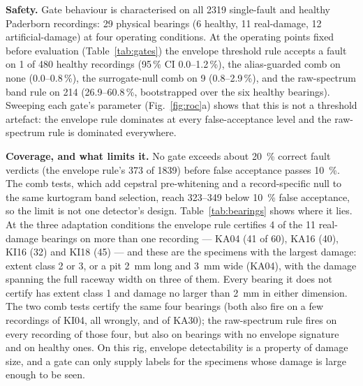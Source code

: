 \textbf{Safety.} Gate behaviour is characterised on all 2319 single-fault and healthy Paderborn recordings: 29 physical
bearings (6 healthy, 11 real-damage, 12 artificial-damage) at four operating conditions. At the operating points fixed
before evaluation (Table~\ref{tab:gates}) the envelope threshold rule accepts a fault on 1 of 480 healthy recordings (95\,\%
CI 0.0--1.2\,\%), the alias-guarded comb on none (0.0--0.8\,\%), the surrogate-null comb on 9 (0.8--2.9\,\%), and the
raw-spectrum band rule on 214 (26.9--60.8\,\%, bootstrapped over the six healthy bearings). Sweeping each gate's parameter
(Fig.~\ref{fig:roc}a) shows that this is not a threshold artefact: the envelope rule dominates at every false-acceptance
level and the raw-spectrum rule is dominated everywhere.

\textbf{Coverage, and what limits it.} No gate exceeds about \SI{20}{\percent} correct fault verdicts (the envelope rule's 373
of 1839) before false acceptance passes \SI{10}{\percent}. The comb tests, which add cepstral pre-whitening and a
record-specific null to the same kurtogram band selection, reach 323--349 below \SI{10}{\percent} false acceptance,
so the limit is not one detector's
design. Table~\ref{tab:bearings} shows where it lies. At the three adaptation conditions the envelope rule certifies 4 of the
11 real-damage bearings on more than one recording --- KA04 (41 of 60), KA16 (40), KI16 (32) and KI18 (45) --- and these are the
specimens with the largest damage: extent class 2 or 3, or a pit \SI{2}{mm} long and \SI{3}{mm} wide (KA04), with the damage
spanning the full raceway width on three of them. Every bearing it does not certify has extent class 1 and damage no larger
than \SI{2}{mm} in either dimension. The two comb tests certify the same four bearings (both also fire on a few recordings of
KI04, all wrongly, and of KA30); the raw-spectrum rule fires on every recording of those four, but also on bearings with no
envelope signature and on healthy ones. On this rig, envelope detectability is a
property of damage size, and a gate can only supply labels for the specimens whose damage is large enough to be seen.

